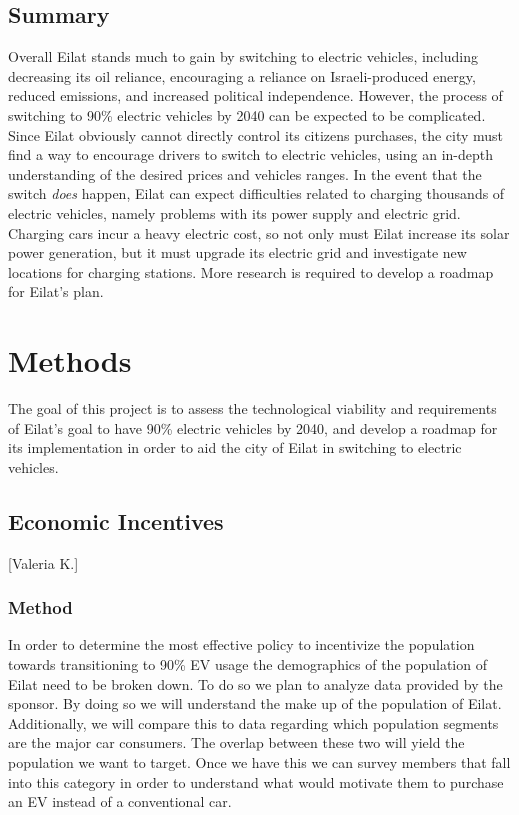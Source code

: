 \documentclass{article}                         %
\begin{document}
\subsection{Summary}
Overall Eilat stands much to gain by switching to electric vehicles, including decreasing its oil reliance, encouraging a reliance on Israeli-produced energy, reduced emissions, and increased political independence. However, the process of switching to 90\% electric vehicles by 2040 can be expected to be complicated. Since Eilat obviously cannot directly control its citizens purchases, the city must find a way to encourage drivers to switch to electric vehicles, using an in-depth understanding of the desired prices and vehicles ranges. In the event that the switch \textit{does} happen, Eilat can expect difficulties related to charging thousands of electric vehicles, namely problems with its power supply and electric grid. Charging cars incur a heavy electric cost, so not only must Eilat increase its solar power generation, but it must upgrade its electric grid and investigate new locations for charging stations. More research is required to develop a roadmap for Eilat's plan.

\newpage
\section{Methods}
The goal of this project is to assess the technological viability and requirements of Eilat's goal to have 90\% electric vehicles by 2040, and develop a roadmap for its implementation in order to aid the city of Eilat in switching to electric vehicles.

\subsection{Economic Incentives}[Valeria K.]
\subsubsection{Method}
In order to determine the most effective policy to incentivize the population towards transitioning to 90\% EV usage the demographics of the population of Eilat need to be broken down. To do so we plan to analyze data provided by the sponsor. By doing so we will understand the make up of the population of Eilat. Additionally, we will compare this to data regarding which population segments are the major car consumers. The overlap between these two will yield the population we want to target. Once we have this we can survey members that fall into this category in order to understand what would motivate them to purchase an EV instead of a conventional car.
\end{document}
